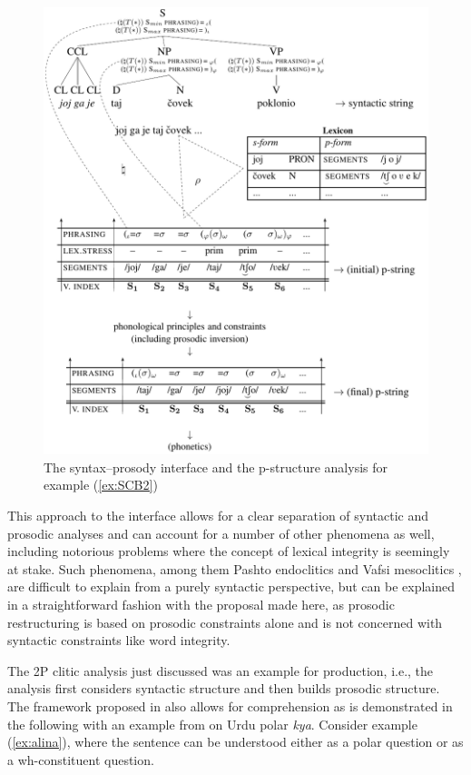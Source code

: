 \documentclass[output=paper,hidelinks]{langscibook}
\begin{document}
\begin{figure}
\includegraphics[width=\textwidth]{figures/Prosody/Boegel_Figure_21.pdf}
\caption{The syntax--prosody interface and the p-structure analysis for example (\ref{ex:SCB2})}
\label{fig:ToV}
\end{figure}

This approach to the interface allows for a clear separation of syntactic and prosodic analyses and can account for a number of other phenomena as well, including notorious problems where the concept of lexical integrity \citep{bresnan1995the-lexical} is seemingly at stake. Such phenomena, among them Pashto endoclitics \citep[][Ch. 6]{Boegel2015} and Vafsi mesoclitics \citep{Boegeletal2018},  are difficult to explain from a purely syntactic perspective, but can be explained in a straightforward fashion with the proposal made here, as prosodic restructuring is based on prosodic constraints alone and is not concerned with syntactic constraints like word integrity. 


The 2P clitic analysis just discussed was an example for production, i.e., the analysis first considers syntactic structure and then builds prosodic structure. The framework proposed in \citet{Boegel2015} also allows for comprehension as is demonstrated in the following with an example from \citet{Buttetal2017,Buttetal2020} on Urdu polar {\em kya}. Consider example (\ref{ex:alina}), where the sentence can be understood either as a polar question or as a wh-constituent question.
\end{document}
